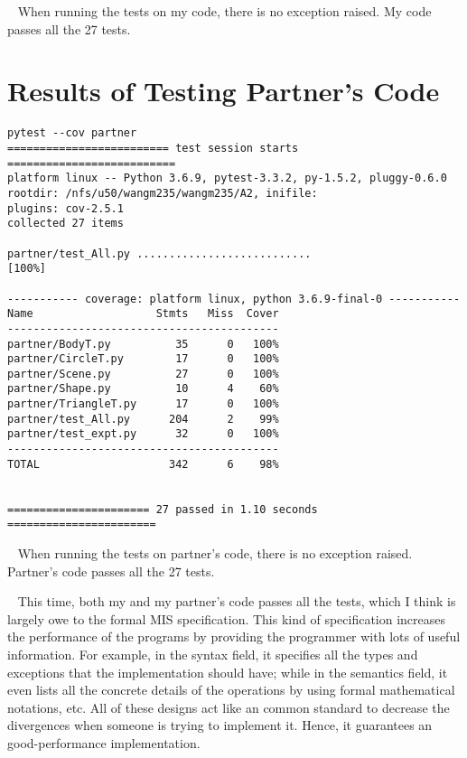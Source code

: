 \documentclass[12pt]{article}
\begin{document}
~\newline\noindent
When running the tests on my code, there is no exception raised. My code passes all the 27 tests.

\section{Results of Testing Partner's Code}
\begin{lstlisting}
pytest --cov partner
========================= test session starts ==========================
platform linux -- Python 3.6.9, pytest-3.3.2, py-1.5.2, pluggy-0.6.0
rootdir: /nfs/u50/wangm235/wangm235/A2, inifile:
plugins: cov-2.5.1
collected 27 items                                                     

partner/test_All.py ...........................                  [100%]

----------- coverage: platform linux, python 3.6.9-final-0 -----------
Name                   Stmts   Miss  Cover
------------------------------------------
partner/BodyT.py          35      0   100%
partner/CircleT.py        17      0   100%
partner/Scene.py          27      0   100%
partner/Shape.py          10      4    60%
partner/TriangleT.py      17      0   100%
partner/test_All.py      204      2    99%
partner/test_expt.py      32      0   100%
------------------------------------------
TOTAL                    342      6    98%


====================== 27 passed in 1.10 seconds =======================
\end{lstlisting}

~\newline\noindent
When running the tests on partner's code, there is no exception raised. Partner's  code passes all the 27 tests.

~\newline\noindent
This time, both my and my partner's code passes all the tests, which I think is largely owe to the formal MIS specification. This kind of specification increases the performance of the programs by providing the programmer with lots of useful information. For example, in the syntax field, it specifies all the types and exceptions that the implementation should have; while in the semantics field, it even lists all the concrete details of the operations by using formal mathematical notations, etc. All of these designs act like an common standard to decrease the divergences when someone is trying to implement it. Hence, it guarantees an good-performance implementation.
\end{document}
